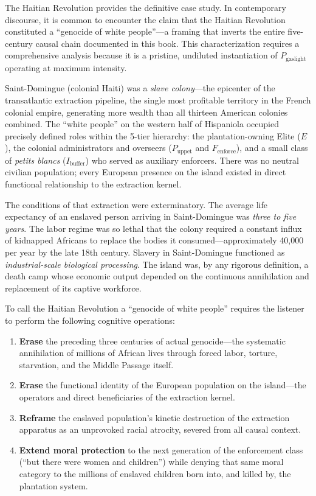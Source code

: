 The Haitian Revolution provides the definitive case study. In contemporary discourse, it is common to encounter the claim that the Haitian Revolution constituted a ``genocide of white people''---a framing that inverts the entire five-century causal chain documented in this book. This characterization requires a comprehensive analysis because it is a pristine, undiluted instantiation of $P_{\text{gaslight}}$ operating at maximum intensity.

Saint-Domingue (colonial Haiti) was a \textit{slave colony}---the epicenter of the transatlantic extraction pipeline, the single most profitable territory in the French colonial empire, generating more wealth than all thirteen American colonies combined. The ``white people'' on the western half of Hispaniola occupied precisely defined roles within the 5-tier hierarchy: the plantation-owning Elite ($E$), the colonial administrators and overseers ($P_{\text{uppet}}$ and $F_{\text{enforce}}$), and a small class of \textit{petits blancs} ($I_{\text{buffer}}$) who served as auxiliary enforcers. There was no neutral civilian population; every European presence on the island existed in direct functional relationship to the extraction kernel.

The conditions of that extraction were exterminatory. The average life expectancy of an enslaved person arriving in Saint-Domingue was \textit{three to five years}. The labor regime was so lethal that the colony required a constant influx of kidnapped Africans to replace the bodies it consumed---approximately 40,000 per year by the late 18th century. Slavery in Saint-Domingue functioned as \textit{industrial-scale biological processing}. The island was, by any rigorous definition, a death camp whose economic output depended on the continuous annihilation and replacement of its captive workforce.

To call the Haitian Revolution a ``genocide of white people'' requires the listener to perform the following cognitive operations:
\begin{enumerate}
    \item \textbf{Erase} the preceding three centuries of actual genocide---the systematic annihilation of millions of African lives through forced labor, torture, starvation, and the Middle Passage itself.
    \item \textbf{Erase} the functional identity of the European population on the island---the operators and direct beneficiaries of the extraction kernel.
    \item \textbf{Reframe} the enslaved population's kinetic destruction of the extraction apparatus as an unprovoked racial atrocity, severed from all causal context.
    \item \textbf{Extend moral protection} to the next generation of the enforcement class (``but there were women and children'') while denying that same moral category to the millions of enslaved children born into, and killed by, the plantation system.
\end{enumerate}

